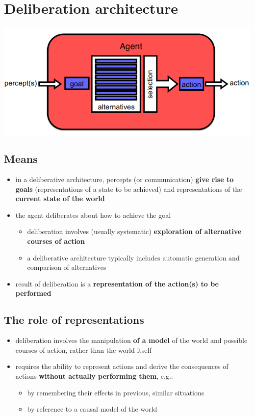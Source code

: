 \documentclass{article}
\begin{document}
\section{Deliberation architecture}
\begin{center}
  \includegraphics[scale=0.5]{deliberative_actor.png}
\end{center}

\subsection{Means}
\begin{itemize}
  \item in a deliberative architecture, percepts (or communication) \textbf{give rise to goals} (representations of a state to be achieved) and representations of the \textbf{current state of the world}
  \item the agent deliberates about how to achieve the goal
  \begin{itemize}
    \item deliberation involves (usually systematic) \textbf{exploration of alternative courses of action}
    \item a deliberative architecture typically includes automatic generation and comparison of alternatives
  \end{itemize}
  \item result of deliberation is a \textbf{representation of the action(s) to be performed}
\end{itemize}

\subsection{The role of representations}
\begin{itemize}
  \item deliberation involves the manipulation \textbf{of a model} of the world and possible courses of action, rather than the world itself 
  \item requires the ability to represent actions and derive the consequences of actions \textbf{without actually performing them}, e.g.:
  \begin{itemize}
    \item by remembering their effects in previous, similar situations
    \item by reference to a causal model of the world
  \end{itemize}
\end{itemize}
\end{document}
